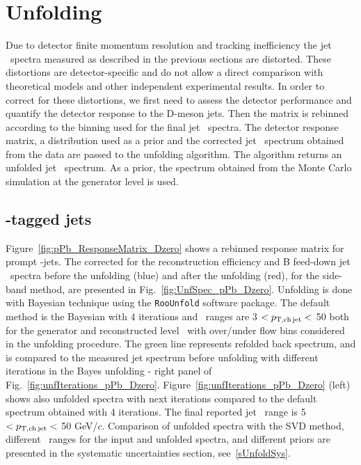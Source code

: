 
\section{Unfolding}
\label{sect:unfResults}

Due to detector finite momentum resolution and tracking inefficiency the jet \pt\ spectra measured as described
in the previous sections are distorted. These distortions are detector-specific and do not allow a direct comparison
with theoretical models and other independent experimental results.
In order to correct for these distortions, we first need to assess the detector performance and quantify
the detector response to the D-meson jets. 
Then the matrix is rebinned according to the binning used for the final jet \pt\ spectra. The detector response matrix, a distribution used as a prior and the corrected jet \pt\ spectrum obtained from the data are passed to the unfolding algorithm. The algorithm returns an unfolded jet \pt\ spectrum. As a prior, the spectrum obtained from the Monte Carlo simulation at the generator level is used.


\subsection{\Dzero-tagged jets}

Figure~\ref{fig:pPb_ResponseMatrix_Dzero} shows a rebinned response matrix for prompt \Dzero-jets.
The corrected for the reconstruction efficiency and B feed-down jet \pt\ spectra before the unfolding (blue) and after the unfolding (red), for the side-band method, are presented in Fig.~\ref{fig:UnfSpec_pPb_Dzero}.
Unfolding is done with Bayesian technique using the \texttt{RooUnfold} software package. The default method is the Bayesian with 4 iterations and \ptchjet\ ranges are 3 $< p_{\mathrm{T,ch\, jet}}< $ 50 both for the generator and reconstructed level \pt\, with over/under flow bins considered in the unfolding procedure.
The green line represents refolded back spectrum, and is compared to the measured jet spectrum before unfolding with different iterations in the Bayes unfolding - right panel of Fig.~\ref{fig:unfIterations_pPb_Dzero}. Figure~\ref{fig:unfIterations_pPb_Dzero} (left) shows also unfolded spectra with next iterations compared to the default spectrum obtained with 4 iterations.
The final reported jet \pt\ range is 5 $< p_{\mathrm{T,ch\, jet}}<$ 50 GeV/$c$.
Comparison of unfolded spectra with the SVD method, different \pt\ ranges for the input and unfolded spectra, and different priors are presented in the systematic uncertainties section, see~\ref{sUnfoldSys}. 

